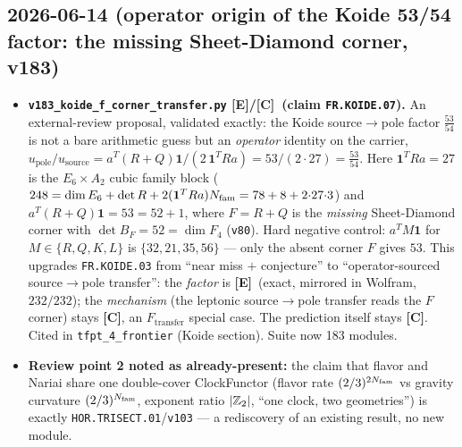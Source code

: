 \documentclass[11pt]{article}
\providecommand{\mE}{\textbf{[E]}}\providecommand{\mC}{\textbf{[C]}}
\providecommand{\vref}[1]{\texttt{#1}}
\begin{document}
\subsection*{2026-06-14 (operator origin of the Koide 53/54 factor: the missing Sheet-Diamond corner, v183)}
\begin{itemize}
\item \textbf{\texttt{v183\_koide\_f\_corner\_transfer.py} \mE/\mC\ (claim \texttt{FR.KOIDE.07}).} An
  external-review proposal, validated exactly: the Koide source$\to$pole factor $\tfrac{53}{54}$ is not
  a bare arithmetic guess but an \emph{operator} identity on the carrier,
  $u_{\mathrm{pole}}/u_{\mathrm{source}} = a^T(R+Q)\mathbf1 / (2\,\mathbf1^T R a) = 53/(2{\cdot}27) =
  \tfrac{53}{54}$. Here $\mathbf1^T R a = 27$ is the $E_6{\times}A_2$ cubic family block
  ($248 = \dim E_6 + \det R + 2(\mathbf1^T R a)N_{\mathrm{fam}} = 78+8+2{\cdot}27{\cdot}3$) and
  $a^T(R+Q)\mathbf1 = 53 = 52+1$, where $F = R+Q$ is the \emph{missing} Sheet-Diamond corner with
  $\det B_F = 52 = \dim F_4$ (\vref{v80}). Hard negative control: $a^T M\mathbf1$ for $M\in\{R,Q,K,L\}$
  is $\{32,21,35,56\}$ --- only the absent corner $F$ gives $53$. This upgrades \texttt{FR.KOIDE.03}
  from ``near miss $+$ conjecture'' to ``operator-sourced source$\to$pole transfer'': the \emph{factor}
  is \mE\ (exact, mirrored in Wolfram, $232/232$); the \emph{mechanism} (the leptonic source$\to$pole
  transfer reads the $F$ corner) stays \mC, an $F_{\mathrm{transfer}}$ special case. The prediction
  itself stays \mC. Cited in \texttt{tfpt\_4\_frontier} (Koide section). Suite now 183 modules.
\item \textbf{Review point 2 noted as already-present:} the claim that flavor and Nariai share one
  double-cover ClockFunctor (flavor rate $(2/3)^{2N_{\mathrm{fam}}}$ vs gravity curvature $(2/3)^{N_{\mathrm{fam}}}$, exponent
  ratio $|\mathbb{Z}_2|$, ``one clock, two geometries'') is exactly \texttt{HOR.TRISECT.01}/\vref{v103} --- a
  rediscovery of an existing result, no new module.
\end{itemize}
\end{document}
